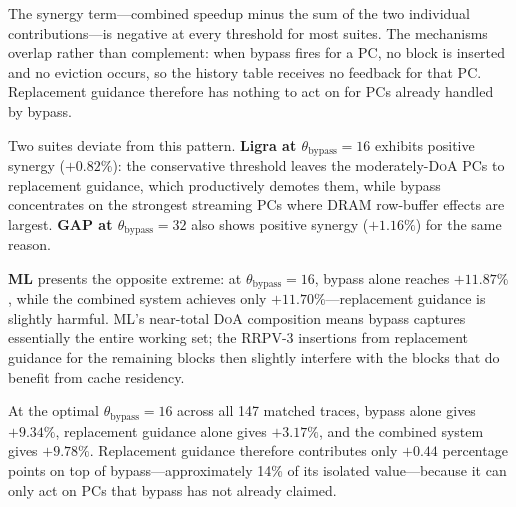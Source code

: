 \documentclass[conference]{IEEEtran}
\newcommand{\doa}{\textsc{DoA}\xspace}
\newcommand{\rrpv}{\textsc{RRPV}\xspace}
\begin{document}
The synergy term---combined speedup minus the sum of the two individual
contributions---is negative at every threshold for most suites. The mechanisms
overlap rather than complement: when bypass fires for a PC, no block is
inserted and no eviction occurs, so the history table receives no feedback for
that PC. Replacement guidance therefore has nothing to act on for PCs already
handled by bypass.

Two suites deviate from this pattern.
\textbf{Ligra at $\theta_{\mathrm{bypass}}=16$} exhibits positive synergy
($+0.82\%$): the conservative threshold leaves the moderately-\doa PCs to
replacement guidance, which productively demotes them, while bypass concentrates
on the strongest streaming PCs where DRAM row-buffer effects are largest.
\textbf{GAP at $\theta_{\mathrm{bypass}}=32$} also shows positive synergy
($+1.16\%$) for the same reason.

\textbf{ML} presents the opposite extreme: at $\theta_{\mathrm{bypass}}=16$,
bypass alone reaches $+11.87\%$, while the combined system achieves only
$+11.70\%$---replacement guidance is slightly harmful. ML's near-total \doa
composition means bypass captures essentially the entire working set; the
\rrpv-3 insertions from replacement guidance for the remaining blocks then
slightly interfere with the blocks that do benefit from cache residency.

At the optimal $\theta_{\mathrm{bypass}}=16$ across all 147 matched traces,
bypass alone gives $+9.34\%$, replacement guidance alone gives $+3.17\%$, and
the combined system gives $+9.78\%$. Replacement guidance therefore contributes
only $+0.44$ percentage points on top of bypass---approximately 14\% of its
isolated value---because it can only act on PCs that bypass has not already
claimed.
\end{document}
